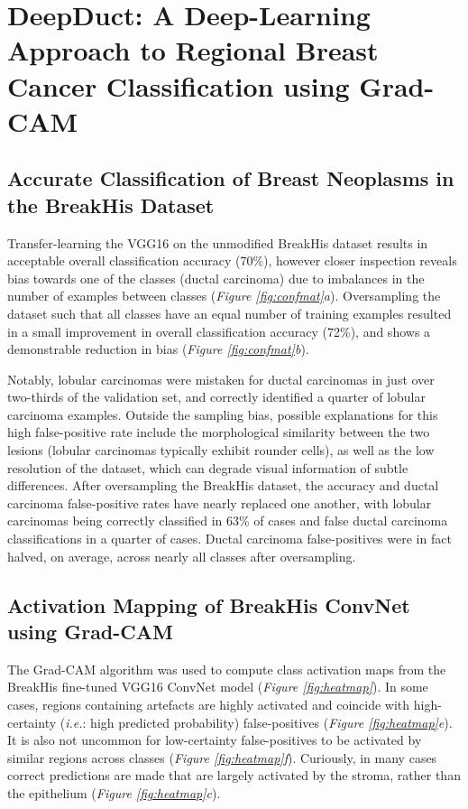 \section{DeepDuct: A Deep-Learning Approach to Regional Breast Cancer Classification using Grad-CAM}

\subsection{Accurate Classification of Breast Neoplasms in the BreakHis Dataset}

Transfer-learning the VGG16 on the unmodified BreakHis dataset results in acceptable overall classification accuracy (70\%), however closer inspection reveals bias towards one of the classes (ductal carcinoma) due to imbalances in the number of examples between classes (\emph{Figure \ref{fig:confmat}a}). Oversampling the dataset such that all classes have an equal number of training examples resulted in a small improvement in overall classification accuracy (72\%), and shows a demonstrable reduction in bias (\emph{Figure \ref{fig:confmat}b}).\par

Notably, lobular carcinomas were mistaken for ductal carcinomas in just over two-thirds of the validation set, and correctly identified a quarter of lobular carcinoma examples. Outside the sampling bias, possible explanations for this high false-positive rate include the morphological similarity between the two lesions (lobular carcinomas typically exhibit rounder cells), as well as the low resolution of the dataset, which can degrade visual information of subtle differences. After oversampling the BreakHis dataset, the accuracy and ductal carcinoma false-positive rates have nearly replaced one another, with lobular carcinomas being correctly classified in 63\% of cases and false ductal carcinoma classifications in a quarter of cases. Ductal carcinoma false-positives were in fact halved, on average, across nearly all classes after oversampling.\par

\subsection{Activation Mapping of BreakHis ConvNet using \mbox{Grad-CAM}}

The Grad-CAM algorithm was used to compute class activation maps from the BreakHis fine-tuned VGG16 ConvNet model (\emph{Figure \ref{fig:heatmap}}). In some cases, regions containing artefacts are highly activated and coincide with high-certainty (\textit{i.e.}: high predicted probability) false-positives (\emph{Figure \ref{fig:heatmap}e}). It is also not uncommon for low-certainty false-positives to be activated by similar regions across classes (\emph{Figure \ref{fig:heatmap}f}). Curiously, in many cases correct predictions are made that are largely activated by the stroma, rather than the epithelium (\emph{Figure \ref{fig:heatmap}c}).




